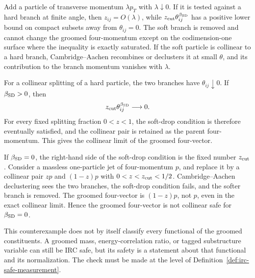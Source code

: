 Add a particle of transverse momentum \(\lambda p_T\) with
\(\lambda\downarrow0\).  If it is tested against a hard branch at finite
angle, then \(z_{ij}=O(\lambda)\), while
\(z_{\rm cut}\theta_{ij}^{\beta_{\rm SD}}\) has a positive lower bound on
compact subsets away from \(\theta_{ij}=0\).  The soft branch is removed and
cannot change the groomed four-momentum except on the codimension-one
surface where the inequality is exactly saturated.  If the soft particle is
collinear to a hard branch, Cambridge--Aachen recombines or declusters it at
small \(\theta\), and its contribution to the branch momentum vanishes with
\(\lambda\).

For a collinear splitting of a hard particle, the two branches have
\(\theta_{ij}\downarrow0\).  If \(\beta_{\rm SD}>0\), then
\[
  z_{\rm cut}\theta_{ij}^{\beta_{\rm SD}}\longrightarrow0.
\]
For every fixed splitting fraction \(0<z<1\), the soft-drop condition is
therefore eventually satisfied, and the collinear pair is retained as the
parent four-momentum.  This gives the collinear limit of the groomed
four-vector.

If \(\beta_{\rm SD}=0\), the right-hand side of the soft-drop condition is the
fixed number \(z_{\rm cut}\).  Consider a massless one-particle jet of
four-momentum \(p\), and replace it by a collinear pair \(zp\) and
\((1-z)p\) with \(0<z<z_{\rm cut}<1/2\).  Cambridge--Aachen declustering sees
the two branches, the soft-drop condition fails, and the softer branch is
removed.  The groomed four-vector is \((1-z)p\), not \(p\), even in the exact
collinear limit.  Hence the groomed four-vector is not collinear safe for
\(\beta_{\rm SD}=0\).

This counterexample does not by itself classify every functional of the
groomed constituents.  A groomed mass, energy-correlation ratio, or tagged
substructure variable can still be IRC safe, but its safety is a statement
about that functional and its normalization.  The check must be made at the
level of Definition~\ref{def:irc-safe-measurement}.

